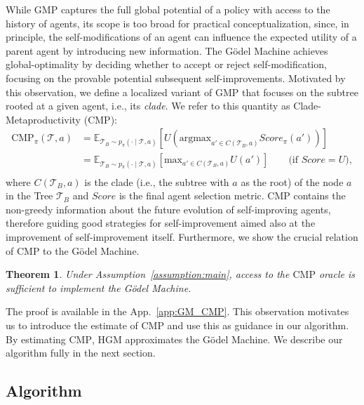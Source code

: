 \documentclass{article}
\newtheorem{theorem}{Theorem}
\begin{document}
While $\mathrm{GMP}$ captures the full global potential of a policy with access to the history of agents, its scope is too broad for practical conceptualization, since, in principle, the self-modifications of an agent can influence the expected utility of a parent agent by introducing new information.
The G\"odel Machine achieves global-optimality by deciding whether to accept or reject self-modification, focusing on the provable potential subsequent self-improvements.
Motivated by this observation, we define a localized variant of $\mathrm{GMP}$ that focuses on the subtree rooted at a given agent, i.e., its \emph{clade}. 
We refer to this quantity as Clade-Metaproductivity ($\mathrm{CMP}$):
\begin{align*}
\mathrm{CMP}_\pi(\mathcal{T},a) &= \mathbb{E}_{\mathcal{T}_B \sim p_\pi(\cdot \mid \mathcal{T},a)}
\left[  U(\text{argmax}_{a' \in C(\mathcal{T}_B, a)}Score_\pi(a')) \right]\\
&=\mathbb{E}_{\mathcal{T}_B \sim p_\pi(\cdot \mid \mathcal{T},a)}
\left[  \text{max}_{a' \in C(\mathcal{T}_B, a)}U(a') \right] \qquad \text{(if $Score = U$)},\\
\end{align*}    
 where $C(\mathcal{T}_B, a)$ is the clade (i.e., the subtree with $a$ as the root) of the node $a$ in the Tree $\mathcal{T}_B$ and $Score$ is the final agent selection metric.
 $\mathrm{CMP}$ contains the non-greedy information about the future evolution of self-improving agents, therefore guiding good strategies for self-improvement aimed also at the improvement of self-improvement itself. Furthermore, we show the crucial relation of $\mathrm{CMP}$ to the G\"odel Machine.



\begin{theorem}\label{thm:main}
Under Assumption~\ref{assumption:main}, access to the $\mathrm{CMP}$ oracle is sufficient to implement the G\"odel Machine.
\end{theorem}

The proof is available in the App.~\ref{app:GM_CMP}. This observation motivates us to introduce the estimate of $\mathrm{CMP}$ and use this as guidance in our algorithm. 
By estimating $\mathrm{CMP}$, HGM approximates the G\"odel Machine. We describe our algorithm fully in the next section.





\subsection{Algorithm}\label{sec:main_alg}
\end{document}
